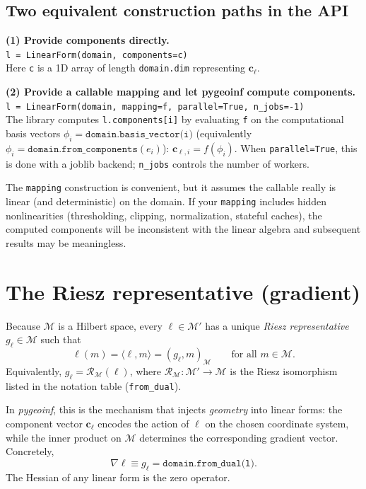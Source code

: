 \documentclass[11pt,twoside,openright]{book}
\theoremstyle{plain}
\theoremstyle{definition}
\theoremstyle{remark}
\newcommand{\modelspace}{\mathcal{M}}
\newcommand{\pair}[2]{\langle #1, #2\rangle}
\newcommand{\Riesz}{\mathcal{R}}
\begin{document}
\subsection*{Two equivalent construction paths in the API}

\begin{codebox}
\textbf{(1) Provide components directly.}\\
\texttt{l = LinearForm(domain, components=c)}\\
Here \texttt{c} is a 1D array of length \texttt{domain.dim} representing
$\mathbf{c}_\ell$.

\medskip
\textbf{(2) Provide a callable mapping and let pygeoinf compute components.}\\
\texttt{l = LinearForm(domain, mapping=f, parallel=True, n\_jobs=-1)}\\
The library computes \texttt{l.components[i]} by evaluating \texttt{f} on the
computational basis vectors $\phi_i=\texttt{domain.basis\_vector(i)}$
(equivalently $\phi_i=\texttt{domain.from\_components}(e_i)$):
$\mathbf{c}_{\ell,i} = f(\phi_i)$.
When \texttt{parallel=True}, this is done with a joblib backend; \texttt{n\_jobs}
controls the number of workers.
\end{codebox}

\begin{pitfallbox}
The \texttt{mapping} construction is convenient, but it assumes the callable
really is linear (and deterministic) on the domain.
If your \texttt{mapping} includes hidden nonlinearities (thresholding, clipping,
normalization, stateful caches), the computed components will be inconsistent
with the linear algebra and subsequent results may be meaningless.
\end{pitfallbox}

\section{The Riesz representative (gradient)}
\label{sec:form-riesz-rep}

Because $\modelspace$ is a Hilbert space, every $\ell\in\modelspace'$ has a
unique \emph{Riesz representative} $g_\ell\in\modelspace$ such that
\[
  \ell(m) = \pair{\ell}{m} = (g_\ell, m)_{\modelspace}\qquad\text{for all } m\in\modelspace.
\]
Equivalently, $g_\ell = \Riesz_{\modelspace}(\ell)$, where
$\Riesz_{\modelspace}:\modelspace'\to\modelspace$ is the Riesz isomorphism
listed in the notation table (\texttt{from\_dual}).

In \textit{pygeoinf}, this is the mechanism that injects \emph{geometry} into
linear forms: the component vector $\mathbf{c}_\ell$ encodes the action of
$\ell$ on the chosen coordinate system, while the inner product on
$\modelspace$ determines the corresponding gradient vector.
Concretely,
\[
  \nabla\ell \equiv g_\ell = \texttt{domain.from\_dual(l)}.
\]
The Hessian of any linear form is the zero operator.
\end{document}
